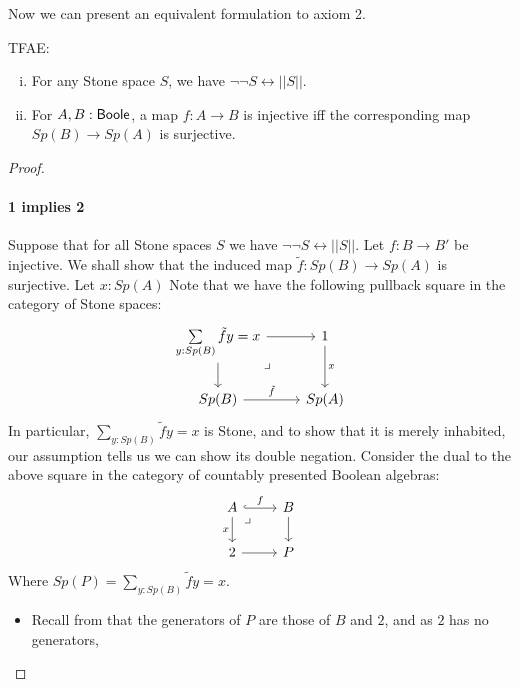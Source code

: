 Now we can present an equivalent formulation to axiom 2. 
\begin{lemma}
  TFAE:
  \begin{enumerate}[(i)]
    \item For any Stone space $S$, we have $\neg \neg S \leftrightarrow ||S||$. 
    \item For $A,B:\mathsf{Boole}$, a map $f:A\to B$ is injective iff the corresponding map $Sp(B) \to Sp(A)$ is surjective. 
  \end{enumerate}
\end{lemma} 
\begin{proof}
\item \paragraph{1 implies 2}
  Suppose that for all Stone spaces $S$ we have $\neg \neg S\leftrightarrow ||S||$. 
  Let $f:B\to B'$ be injective. We shall show that the induced map $\tilde f: Sp(B) \to Sp(A)$ is surjective. 
  Let $x:Sp(A)$
  Note that we have the following pullback square in the category of Stone spaces:
  \begin{equation}\begin{tikzcd}
    \sum\limits_{y:Sp(B)} \tilde f y = x \arrow[d] \arrow[r] \arrow["\lrcorner"{pos=0.125}, phantom, dr] 
    & 1 \arrow[d,"x"]\\
    Sp(B) \arrow[r,"\tilde f"] & Sp(A)
  \end{tikzcd}  \end{equation}
  In particular, $\sum\limits_{y:Sp(B)} \tilde f y = x$ is Stone, and to show that it is merely inhabited, 
  our assumption tells us we can show its double negation. 
  Consider the dual to the above square in the category of countably presented Boolean algebras:
  \begin{equation}\begin{tikzcd}
    A \arrow[d,"x"'] \arrow[r,hook,"f"] \arrow[rd,phantom,"\lrcorner"{pos=0.125}] & B\arrow[d]\\
    2 \arrow[r] & P
  \end{tikzcd}\end{equation}  
  Where $Sp(P) = \sum\limits_{y:Sp(B)} \tilde f y = x$. 
  \begin{itemize}
    \item 
  Recall from  that the generators of $P$ are those of $B$ and $2$, and as $2$ has no generators, 

\end{itemize}
\end{proof}
